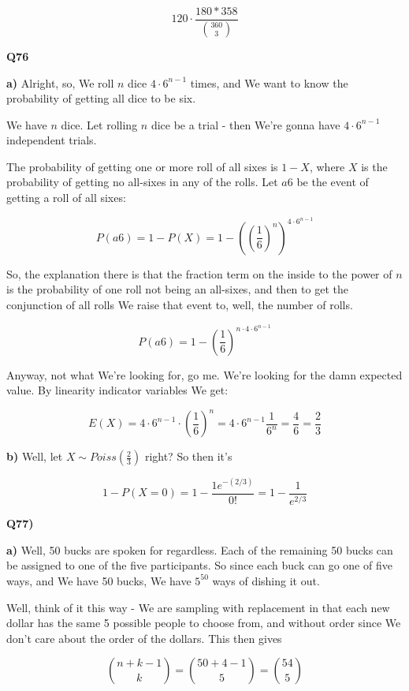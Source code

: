\documentclass{article}
\begin{document}
		\[ 120\cdot\frac{180*358}{{360\choose 3}} \]
		
		\hfill
		
		\textbf{Q76}
		
		\textbf{a)} Alright, so, We roll $n$ dice $4\cdot 6^{n-1}$ times, and We want to know the probability of getting all dice to be six. 
		
		We have $n$ dice. Let rolling $n$ dice be a trial - then We're gonna have $4\cdot 6^{n-1}$ independent trials. 
		
		The probability of getting one or more roll of all sixes is $1 - X$, where $X$ is the probability of getting no all-sixes in any of the rolls. Let $a6$ be the event of getting a roll of all sixes:
		
		\[ P(a6) = 1-P(X) = 1 - \left(\left(\frac{1}{6} \right)^n\right)^{4\cdot 6^{n-1}} \] 
		
		So, the explanation there is that the fraction term on the inside to the power of $n$ is the probability of one roll not being an all-sixes, and then to get the conjunction of all rolls We raise that event to, well, the number of rolls.
		
		\[ P(a6) = 1 - \left(\frac{1}{6} \right)^{n\cdot 4\cdot 6^{n-1}} \] 
		
		Anyway, not what We're looking for, go me. We're looking for the damn expected value. By linearity indicator variables We get:
		
		\[ E(X) = 4\cdot 6^{n-1}\cdot\left(\frac{1}{6} \right)^n  = 4\cdot6^{n-1}\frac{1}{6^n} = \frac{4}{6} = \frac{2}{3}\]
		
		\textbf{b)} Well, let $X\sim Poiss(\frac{2}{3})$ right? So then it's
		
		\[ 1 - P(X=0) = 1 - \frac{1e^{-(2/3)}}{0!} = 1 - \frac{1}{e^{2/3}} \]
		
		\hfill
		
		\textbf{Q77)}
		
		\textbf{a)} Well, 50 bucks are spoken for regardless. Each of the remaining 50 bucks can be assigned to one of the five participants. So since each buck can go one of five ways, and We have 50 bucks, We have $5^50$ ways of dishing it out. 
		
		Well, think of it this way - We are sampling with replacement in that each new dollar has the same 5 possible people to choose from, and without order since We don't care about the order of the dollars. This then gives
		
		\[ {n+k-1\choose k} = {50+4-1\choose 5} = {54\choose 5} \]
		
\end{document}
